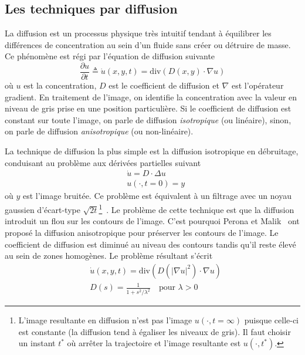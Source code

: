 \subsection{Les techniques par diffusion}

La diffusion est un processus physique très intuitif tendant à équilibrer les différences de concentration au sein d'un fluide sans créer ou détruire de masse. Ce phénomène est régi par l'équation de diffusion suivante
\begin{equation}
    \frac{\partial u}{\partial t} \triangleq \dot{u}(x, y, t) = \mathrm{div} (D(x, y)\cdot \nabla u)
\end{equation}
où $u$ est la concentration, $D$ est le coefficient de diffusion et $\nabla$ est l'opérateur gradient. En traitement de l'image, on identifie la concentration avec la valeur en niveau de gris prise en une position particulière. Si le coefficient de diffusion est constant sur toute l'image, on parle de diffusion \emph{isotropique} (ou linéaire), sinon, on parle de diffusion \emph{anisotropique} (ou non-linéaire).

La technique de diffusion la plus simple est la diffusion isotropique en débruitage, conduisant au problème aux dérivées partielles suivant
\begin{align}
&\dot{u} = D \cdot \Delta u\\
&u(\cdot, t=0) = y
\end{align}
où $y$ est l'image bruitée. Ce problème est équivalent à un filtrage avec un noyau gaussien d'écart-type $\sqrt{2t}$\footnote{L'image resultante en diffusion n'est pas l'image $u(\cdot, t=\infty)$ puisque celle-ci est constante (la diffusion tend à égaliser les niveaux de gris). Il faut choisir un instant $t^*$ où arrêter la trajectoire et l'image resultante est $u(\cdot, t^*)$.}~\cite{weickert1998anisotropic}. Le problème de cette technique est que la diffusion introduit un flou sur les contours de l'image. C'est pourquoi Perona et Malik~\cite{perona1990scale} ont proposé la diffusion anisotropique pour préserver les contours de l'image. Le coefficient de diffusion est diminué au niveau des contours tandis qu'il reste élevé au sein de zones homogènes. Le problème résultant s'écrit
\begin{align}
    &\dot{u}(x, y, t) = \mathrm{div} (D(|\nabla u|^2)\cdot \nabla u)\\
    & D(s) = \frac{1}{1+s^2/\lambda^2} \quad \text{pour $\lambda > 0$}
\end{align}

